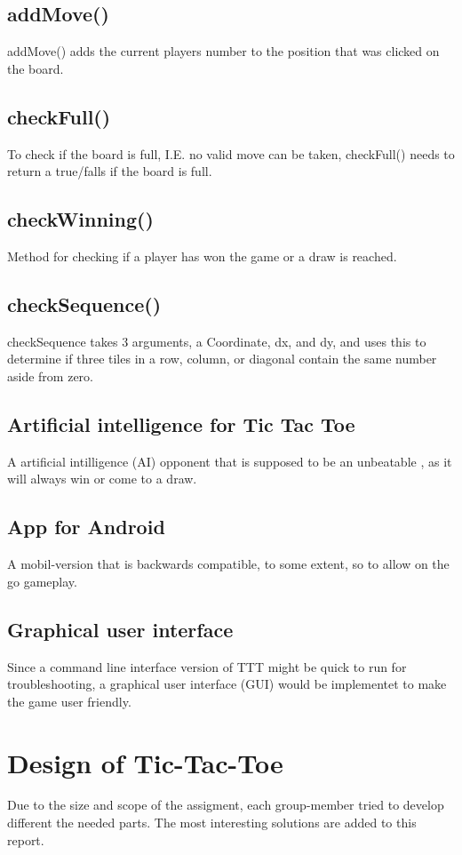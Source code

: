 \documentclass[a4paper,10pt]{article}
\begin{document}
\subsection{addMove()}
addMove() adds the current players number to the position that was clicked on the board.
\subsection{checkFull()}
To check if the board is full, I.E. no valid move can be taken, checkFull() needs to return a true/falls if the board is full.
\subsection{checkWinning()}
Method for checking if a player has won the game or a draw is reached. 
\subsection{checkSequence()}
checkSequence takes 3 arguments, a Coordinate, dx, and dy, and uses this to determine if three tiles in a row, column, or diagonal contain the same number aside from zero.
\subsection{Artificial intelligence for Tic Tac Toe}
	A artificial intilligence (AI) opponent that is supposed to be an unbeatable , as it will always win or come to a draw. 
	\subsection{App for Android}
	A mobil-version that is backwards compatible, to some extent, so to allow on the go gameplay.
	\subsection{Graphical user interface}
	Since a command line interface version of TTT might be quick to run for troubleshooting, a graphical user interface (GUI) would be implementet to make the game user friendly.
	
	\section{Design of Tic-Tac-Toe}
		Due to the size and scope of the assigment, each group-member tried to develop different the needed parts. The most interesting solutions are added to this report.
\end{document}
